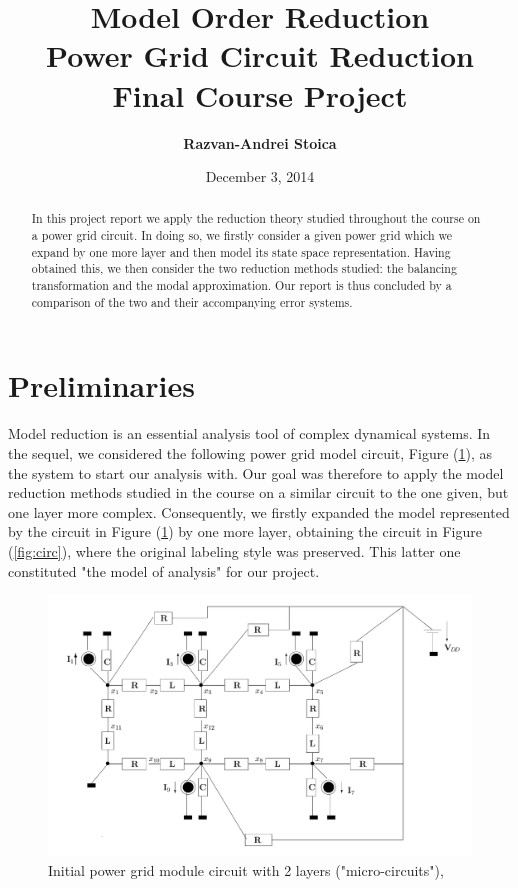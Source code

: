 \documentclass[10pt,a4paper]{article}
\title{\bf Model Order Reduction \\ Power Grid Circuit Reduction \\ Final Course Project}
\author{\bf Razvan-Andrei Stoica}
\date{December 3, 2014}
\begin{document}
\maketitle
\begin{abstract}
In this project report we apply the reduction theory studied throughout the course on a power grid circuit. In doing so, we firstly consider a given power grid which we expand by one more layer and then model its state space representation. Having obtained this, we then consider the two reduction methods studied: the balancing transformation and the modal approximation. Our report is thus concluded by a comparison of the two and their accompanying error systems.  
\end{abstract}

\section{Preliminaries}
Model reduction is an essential analysis tool of complex dynamical systems. In the sequel, we considered the following power grid model circuit, Figure (\ref{fig:orig_circ}), as the system to start our analysis with. Our goal was therefore to apply the model reduction methods studied in the course on a similar circuit to the one given, but one layer more complex. Consequently, we firstly expanded the model represented by the circuit in Figure (\ref{fig:orig_circ}) by one more layer, obtaining the circuit in Figure (\ref{fig:circ}), where the original labeling style was preserved. This latter one constituted "the model of analysis" for our project.

\begin{figure}[!ht]
\centering
\includegraphics[scale=0.3]{./figs/pwr_grid}
\caption{Initial power grid module circuit with 2 layers ("micro-circuits"), \cite{task}}\label{fig:orig_circ}
\end{figure} 
\end{document}
